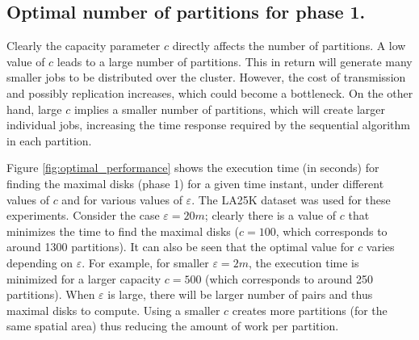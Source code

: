 \subsection{Optimal number of partitions for phase 1.}
Clearly the capacity parameter $c$ directly affects the number of partitions. A low value of $c$ leads to a large number of partitions. This in return will generate many smaller jobs to be distributed over the cluster. However, the cost of transmission and possibly replication increases, which could become a bottleneck.  On the other hand, large $c$ implies a smaller number of partitions, which will create larger individual jobs, increasing the time response required by the sequential algorithm in each partition. 

Figure \ref{fig:optimal_performance} shows the execution time (in seconds) for finding the maximal disks (phase 1) for a given time instant, under different values of $c$ and for various values of $\varepsilon$. The LA25K dataset was used for these experiments. 
Consider the case $\varepsilon = 20m$; clearly there is a value of $c$ that minimizes the time to find the maximal disks ($c=100$, which corresponds to around 1300 partitions). 
It can also be seen that the optimal value for $c$ varies depending on $\varepsilon$.  For example, for smaller $\varepsilon = 2m$, the execution time is minimized for a larger capacity  $c=500$ (which corresponds to around 250 partitions).
When $\varepsilon$ is large, there will be larger number of pairs and thus maximal disks to compute. Using a smaller $c$ creates more partitions (for the same spatial area) thus reducing the amount of work per partition.

